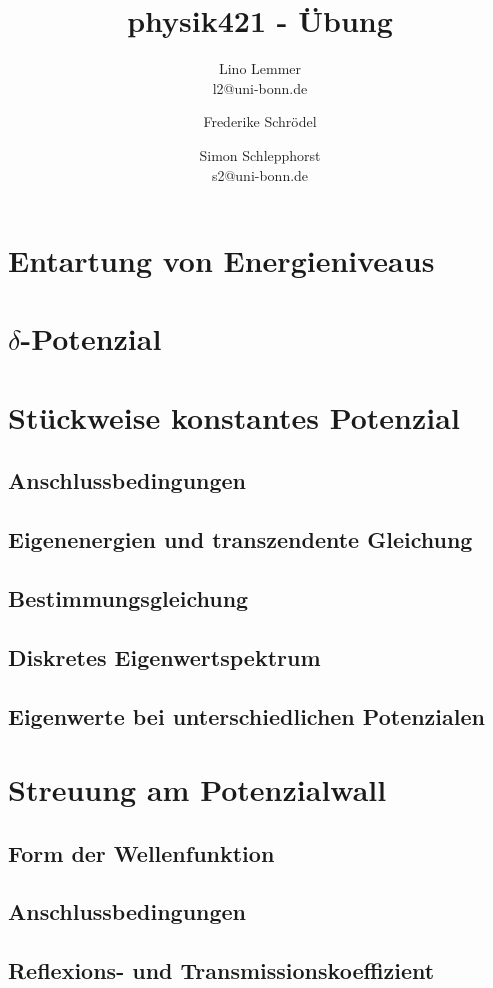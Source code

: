 

\setcounter{thezettel}{2}
\renewcommand\thesection{\arabic{thezettel}.\arabic{section}}

\title{physik421 - Übung }
\author{Lino Lemmer \\ \small{l2@uni-bonn.de} \and Frederike Schrödel \and Simon Schlepphorst\\ 
 \small{s2@uni-bonn.de}}


\maketitle

\section{Entartung von Energieniveaus}

\section{$\delta$-Potenzial}

\section{Stückweise konstantes Potenzial}

\subsection{Anschlussbedingungen}

\subsection{Eigenenergien und transzendente Gleichung}

\subsection{Bestimmungsgleichung}

\subsection{Diskretes Eigenwertspektrum}

\subsection{Eigenwerte bei unterschiedlichen Potenzialen}

\section{Streuung am Potenzialwall}

\subsection{Form der Wellenfunktion}

\subsection{Anschlussbedingungen}

\subsection{Reflexions- und Transmissionskoeffizient}


